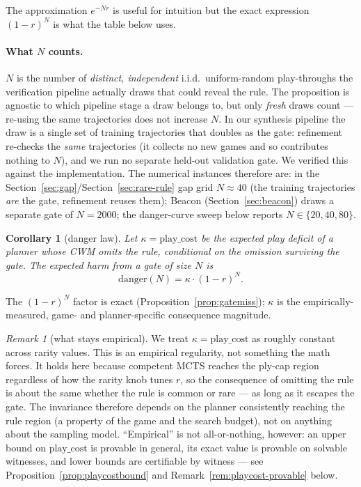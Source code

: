 \documentclass[11pt]{article}
\newtheorem{corollary}{Corollary}
\theoremstyle{remark}
\newtheorem{remark}{Remark}
\begin{document}
The approximation $e^{-Nr}$ is useful for intuition but the exact expression $(1-r)^N$ is what the table below uses.

\paragraph{What $N$ counts.} $N$ is the number of \emph{distinct, independent} i.i.d.\ uniform-random play-throughs the verification pipeline actually draws that could reveal the rule. The proposition is agnostic to which pipeline stage a draw belongs to, but only \emph{fresh} draws count --- re-using the same trajectories does not increase $N$. In our synthesis pipeline the draw is a single set of training trajectories that doubles as the gate: refinement re-checks the \emph{same} trajectories (it collects no new games and so contributes nothing to $N$), and we run no separate held-out validation gate. We verified this against the implementation. The numerical instances therefore are: in the Section~\ref{sec:gap}/Section~\ref{sec:rare-rule} gap grid $N \approx 40$ (the training trajectories \emph{are} the gate, refinement reuses them); Beacon (Section~\ref{sec:beacon}) draws a separate gate of $N = 2000$; the danger-curve sweep below reports $N \in \{20, 40, 80\}$.

\begin{corollary}[danger law]
\label{cor:dangerlaw}
Let $\kappa = \mathrm{play\_cost}$ be the expected play deficit of a planner whose CWM omits the rule, conditional on the omission surviving the gate. The expected harm from a gate of size $N$ is
\[
\mathrm{danger}(N) = \kappa \cdot (1 - r)^N.
\]
\end{corollary}

The $(1-r)^N$ factor is exact (Proposition~\ref{prop:gatemiss}); $\kappa$ is the empirically-measured, game- and planner-specific consequence magnitude.

\begin{remark}[what stays empirical]
We treat $\kappa = \mathrm{play\_cost}$ as roughly constant across rarity values. This is an empirical regularity, not something the math forces. It holds here because competent MCTS reaches the ply-cap region regardless of how the rarity knob tunes $r$, so the consequence of omitting the rule is about the same whether the rule is common or rare --- as long as it escapes the gate. The invariance therefore depends on the planner consistently reaching the rule region (a property of the game and the search budget), not on anything about the sampling model. ``Empirical'' is not all-or-nothing, however: an upper bound on $\mathrm{play\_cost}$ is provable in general, its exact value is provable on solvable witnesses, and lower bounds are certifiable by witness --- see Proposition~\ref{prop:playcostbound} and Remark~\ref{rem:playcost-provable} below.
\end{remark}
\end{document}
